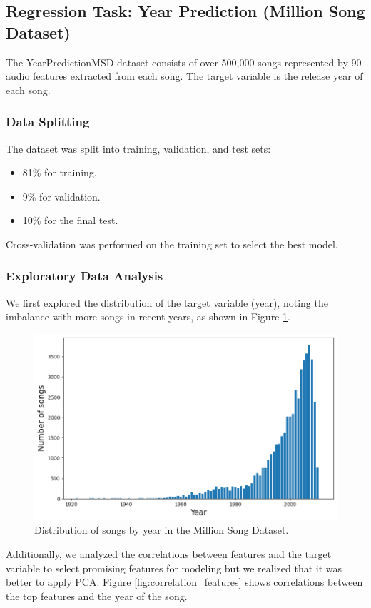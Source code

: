 \documentclass[twocolumn]{article}
\begin{document}
\subsection{Regression Task: Year Prediction (Million Song Dataset)}
The YearPredictionMSD dataset consists of over 500,000 songs 
represented by 90 audio features extracted from each song. The target 
variable is the release year of each song.

\subsubsection{Data Splitting}
The dataset was split into training, validation, and test sets:
\begin{itemize}
    \item 81\% for training.
    \item 9\% for validation.
    \item 10\% for the final test.
\end{itemize}
Cross-validation was performed on the training set to select the best model.

\subsubsection{Exploratory Data Analysis}
We first explored the distribution of the target variable (year), 
noting the imbalance with more songs in recent years, as shown in Figure \ref{fig:year_distribution}.

\begin{figure}[h]
    \centering
    \includegraphics[width=0.8\linewidth]{images/songs/year_songs.png}
    \caption{Distribution of songs by year in the Million Song Dataset.}
    \label{fig:year_distribution}
\end{figure}


Additionally, we analyzed the correlations between features and the target variable 
to select promising features for modeling but we realized that it was better to apply PCA. 
Figure \ref{fig:correlation_features} shows correlations between the top features and the year of the song.
\end{document}
